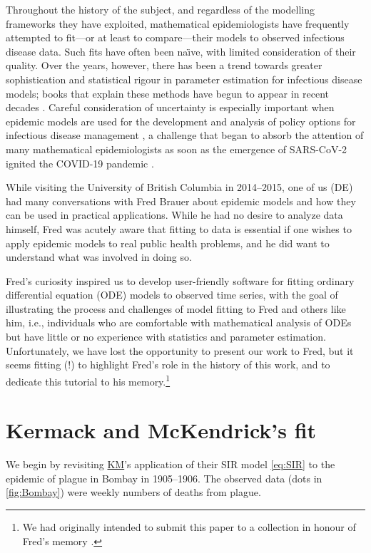 \documentclass[]{interact}\usepackage[]{graphicx}\usepackage[]{xcolor}
\theoremstyle{plain}%
\theoremstyle{definition}
\theoremstyle{remark}
\newcommand{\KM}{\protect\hyperlink{cite.KermMcKe27}{KM}\xspace}
\begin{document}
Throughout the history of the subject, and regardless of the modelling
frameworks they have exploited, mathematical epidemiologists have
frequently attempted to fit---or at least to compare---their models to
observed infectious disease data. Such fits have often been
na\"{\i}ve, with limited consideration of their quality. Over the
years, however, there has been a trend towards greater sophistication
and statistical rigour in parameter estimation for infectious disease
models; books that explain these methods have begun to appear in
recent decades \citep{Bolk08,bjorn2018}.  Careful
consideration of uncertainty is especially important when epidemic
models are used for the development and analysis of policy options for
infectious disease management \citep{elderd2006uncertainty}, a
challenge that began to absorb the attention of many mathematical
epidemiologists as soon as the emergence of SARS-CoV-2 ignited the
COVID-19 pandemic \citep{Broo+21,Hill+21,Nixo+22,howerton2023evaluation}.

While visiting the University of British Columbia in 2014--2015, one
of us (DE) had many conversations with Fred Brauer about epidemic
models and how they can be used in practical applications.  While he
had no desire to analyze data himself, Fred was acutely aware that
fitting to data is essential if one wishes to apply epidemic
models to real public health problems, and he did want to understand
what was involved in doing so.

Fred's curiosity inspired us to develop user-friendly software for
fitting ordinary differential equation (ODE) models to observed time
series, with the goal of illustrating the process and challenges of
model fitting to Fred and others like him, i.e., individuals who are
comfortable with mathematical analysis of ODEs but have little or no
experience with statistics and parameter estimation.  Unfortunately,
we have lost the opportunity to present our work to Fred, but it seems
fitting (!) to highlight Fred's role in the history of this work, and
to dedicate this tutorial to his memory.\footnote{We had originally
intended to submit this paper to a collection in honour of Fred's memory
\citep{Kribvand23}.}

\section{Kermack and McKendrick's fit}

We begin by revisiting \KM's
application of their SIR model \eqref{eq:SIR} to the epidemic of
plague in Bombay in 1905--1906.  The observed data (dots in
\cref{fig:Bombay}) were weekly numbers of deaths from plague.
\end{document}
